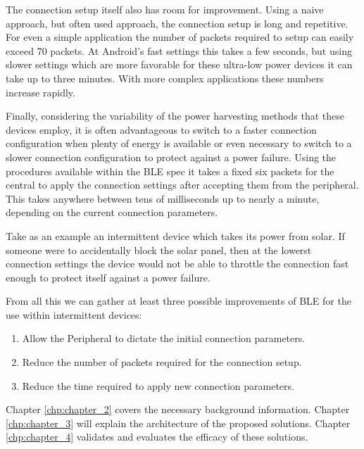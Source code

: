 The connection setup itself also has room for improvement. Using a naive approach, but often used approach, the connection setup is long and repetitive. For even a simple application the number of packets required to setup can easily exceed 70 packets. At Android's fast settings this takes a few seconds, but using slower settings which are more favorable for these ultra-low power devices it can take up to three minutes. With more complex applications these numbers increase rapidly.

Finally, considering the variability of the power harvesting methods that these devices employ, it is often advantageous to switch to a faster connection configuration when plenty of energy is available or even necessary to switch to a slower connection configuration to protect against a power failure. Using the procedures available within the BLE spec it takes a fixed six packets for the central to apply the connection settings after accepting them from the peripheral. This takes anywhere between tens of milliseconds up to nearly a minute, depending on the current connection parameters. 

Take as an example an intermittent device which takes its power from solar. If someone were to accidentally block the solar panel, then at the lowerst connection settings the device would not be able to throttle the connection fast enough to protect itself against a power failure.

From all this we can gather at least three possible improvements of BLE for the use within intermittent devices:
\begin{enumerate}
    \item Allow the Peripheral to dictate the initial connection parameters.
    \item Reduce the number of packets required for the connection setup.
    \item Reduce the time required to apply new connection parameters.
\end{enumerate}
Chapter \ref*{chp:chapter_2} covers the necessary background information. Chapter \ref*{chp:chapter_3} will explain the architecture of the proposed solutions. Chapter \ref*{chp:chapter_4} validates and evaluates the efficacy of these solutions.